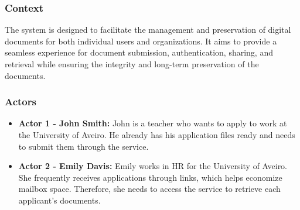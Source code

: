 \documentclass[a4paper,11pt]{article}
\begin{document}
    \subsubsection{Context}
        The system is designed to facilitate the management and preservation of digital documents for both individual users and organizations. It aims to provide a seamless experience for document submission, authentication, sharing, and retrieval while ensuring the integrity and long-term preservation of the documents.
        
    \subsubsection{Actors}
        \begin{itemize}
            \item \textbf{Actor 1 - John Smith:} John is a teacher who wants to apply to work at the University of Aveiro. He already has his application files ready and needs to submit them through the service.
            \item \textbf{Actor 2 - Emily Davis:} Emily works in HR for the University of Aveiro. She frequently receives applications through links, which helps economize mailbox space. Therefore, she needs to access the service to retrieve each applicant's documents.
        \end{itemize}
        
        
\end{document}
